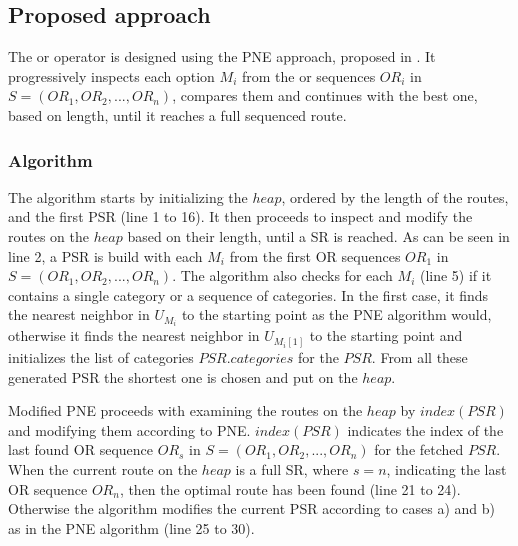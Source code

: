 
\subsection{Proposed approach} 
\label{sec:approachOr}
The or operator is designed using the PNE approach, proposed in \cite{OSR}. It progressively inspects each option $M_i$ from the or sequences $OR_i$ in \newline $S = (OR_1, OR_2, ..., OR_n)$, compares them and continues with the best one, based on length, until it reaches a full sequenced route.

\subsubsection{Algorithm}
\label{sec:algortihmOr}
The algorithm \texttt{} starts by initializing the $heap$, ordered by the length of the routes, and the first PSR (line 1 to 16). It then proceeds to inspect and modify the routes on the $heap$ based on their length, until a SR is reached. As can be seen in line 2, a PSR is build with each $M_i$ from the first OR sequences $OR_1$ in $S = (OR_1, OR_2, ..., OR_n)$. The algorithm also checks for each $M_i$ (line 5) if it contains a single category or a sequence of categories. In the first case, it finds the nearest neighbor in $U_{M_i}$ to the starting point as the PNE algorithm would, otherwise it finds the nearest neighbor in $U_{M_i[1]}$ to the starting point and initializes the list of categories $PSR.categories$ for the $PSR$. From all these generated PSR the shortest one is chosen and put on the $heap$.

Modified PNE proceeds with examining the routes on the $heap$ by $index(PSR)$ and modifying them according to PNE. $index(PSR)$ indicates the index of the last found OR sequence $OR_s$ in $S = (OR_1, OR_2, ..., OR_n)$ for the fetched $PSR$. When the current route on the $heap$ is a full SR, where $s = n$, indicating the last OR sequence $OR_n$, then the optimal route has been found (line 21 to 24). Otherwise the algorithm modifies the current PSR according to cases a) and b) as in the PNE algorithm (line 25 to 30). \newline

